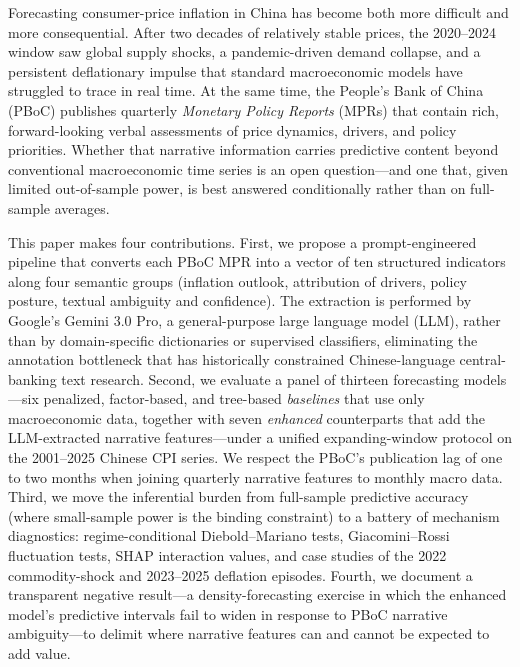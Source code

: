 \documentclass[AER]{AEA}
\begin{document}
\maketitle

Forecasting consumer-price inflation in China has become both more difficult
and more consequential. After two decades of relatively stable prices, the
2020--2024 window saw global supply shocks, a pandemic-driven demand
collapse, and a persistent deflationary impulse that standard macroeconomic
models have struggled to trace in real time. At the same time, the People's
Bank of China (PBoC) publishes quarterly \emph{Monetary Policy Reports}
(MPRs) that contain rich, forward-looking verbal assessments of price
dynamics, drivers, and policy priorities. Whether that narrative information
carries predictive content beyond conventional macroeconomic time series is
an open question---and one that, given limited out-of-sample power, is best
answered conditionally rather than on full-sample averages.

This paper makes four contributions. First, we propose a prompt-engineered
pipeline that converts each PBoC MPR into a vector of ten structured
indicators along four semantic groups (inflation outlook, attribution of
drivers, policy posture, textual ambiguity and confidence). The extraction
is performed by Google's Gemini 3.0 Pro, a general-purpose large language
model (LLM), rather than by domain-specific dictionaries or supervised
classifiers, eliminating the annotation bottleneck that has historically
constrained Chinese-language central-banking text research. Second, we
evaluate a panel of thirteen forecasting models---six penalized,
factor-based, and tree-based \emph{baselines} that use only macroeconomic
data, together with seven \emph{enhanced} counterparts that add the
LLM-extracted narrative features---under a unified expanding-window
protocol on the 2001--2025 Chinese CPI series. We respect the PBoC's
publication lag of one to two months when joining quarterly narrative
features to monthly macro data. Third, we move the inferential burden from
full-sample predictive accuracy (where small-sample power is the binding
constraint) to a battery of mechanism diagnostics: regime-conditional
Diebold--Mariano tests, Giacomini--Rossi fluctuation tests, SHAP interaction
values, and case studies of the 2022 commodity-shock and 2023--2025
deflation episodes. Fourth, we document a transparent negative result---a
density-forecasting exercise in which the enhanced model's predictive
intervals fail to widen in response to PBoC narrative ambiguity---to delimit
where narrative features can and cannot be expected to add value.
\end{document}
